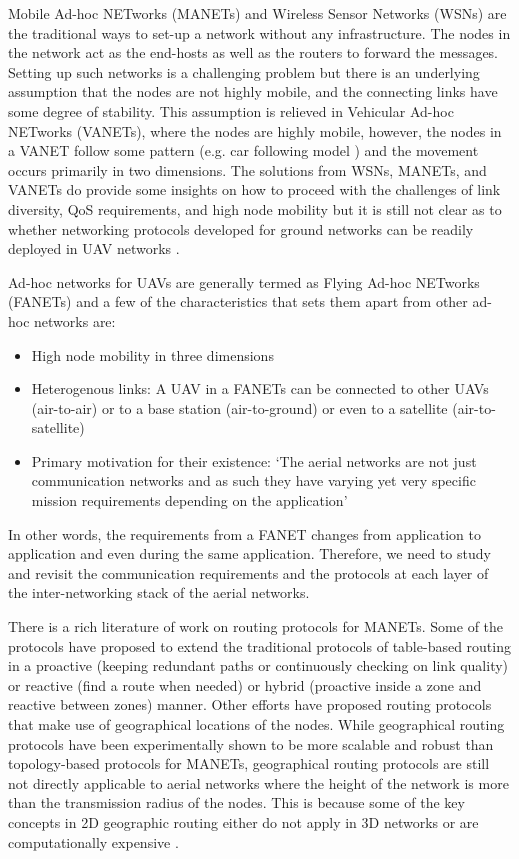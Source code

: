 Mobile Ad-hoc NETworks (MANETs) and Wireless Sensor Networks (WSNs) are the traditional ways to set-up a network without any infrastructure. The nodes in the network act as the end-hosts as well as the routers to forward the messages. Setting up such networks is a challenging problem but there is an underlying assumption that the nodes are not highly mobile, and the connecting links have some degree of stability. This assumption is relieved in Vehicular Ad-hoc NETworks (VANETs), where the nodes are highly mobile, however, the nodes in a VANET follow some pattern (e.g. car following model \cite{rothery1992car}) and the movement occurs primarily in two dimensions. The solutions from WSNs, MANETs, and VANETs do provide some insights on how to proceed with the challenges of link diversity, QoS requirements, and high node mobility but it is still not clear as to whether networking protocols developed for ground networks can be readily deployed in UAV networks \cite{7463007}. 

Ad-hoc networks for UAVs are generally termed as Flying Ad-hoc NETworks (FANETs) and a few of the characteristics that sets them apart from other ad-hoc networks are:
\begin{itemize}
    \item High node mobility in three dimensions 
    \item Heterogenous links: A UAV in a FANETs can be connected to other UAVs (air-to-air) or to a base station (air-to-ground) or even to a satellite (air-to-satellite)
    \item Primary motivation for their existence: `The aerial networks are not just communication networks and as such they have varying yet very specific mission requirements depending on the application' \cite{7463007}
\end{itemize}  

In other words, the requirements from a FANET changes from application to application and even during the same application. Therefore, we need to study and revisit the communication requirements and the protocols at each layer of the inter-networking stack of the aerial networks.

There is a rich literature of work on routing protocols for MANETs. Some of the protocols have proposed to extend the traditional protocols of table-based routing in a proactive (keeping redundant paths or continuously checking on link quality) or reactive (find a route when needed) or hybrid (proactive inside a zone and reactive between zones) manner. Other efforts have proposed routing protocols that make use of geographical locations of the nodes. While geographical routing protocols have been experimentally shown to be more scalable and robust than topology-based protocols for MANETs, geographical routing protocols are still not directly applicable to aerial networks where the height of the network is more than the transmission radius of the nodes. This is because some of the key concepts in 2D geographic routing either do not apply in 3D networks or are computationally expensive \cite{6238283}.

